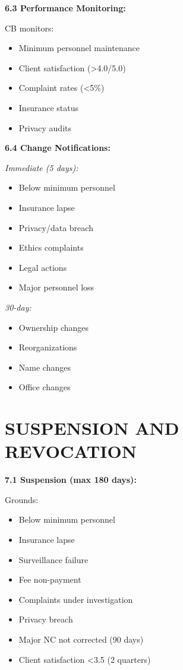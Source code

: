 \documentclass[11pt,a4paper]{article}
\begin{document}
\textbf{6.3 Performance Monitoring:}

CB monitors:
\begin{itemize}
\item Minimum personnel maintenance
\item Client satisfaction (>4.0/5.0)
\item Complaint rates (<5\%)
\item Insurance status
\item Privacy audits
\end{itemize}

\textbf{6.4 Change Notifications:}

\textit{Immediate (5 days):}
\begin{itemize}
\item Below minimum personnel
\item Insurance lapse
\item Privacy/data breach
\item Ethics complaints
\item Legal actions
\item Major personnel loss
\end{itemize}

\textit{30-day:}
\begin{itemize}
\item Ownership changes
\item Reorganizations
\item Name changes
\item Office changes
\end{itemize}

\section{SUSPENSION AND REVOCATION}

\textbf{7.1 Suspension (max 180 days):}

Grounds:
\begin{itemize}
\item Below minimum personnel
\item Insurance lapse
\item Surveillance failure
\item Fee non-payment
\item Complaints under investigation
\item Privacy breach
\item Major NC not corrected (90 days)
\item Client satisfaction <3.5 (2 quarters)
\end{itemize}
\end{document}
